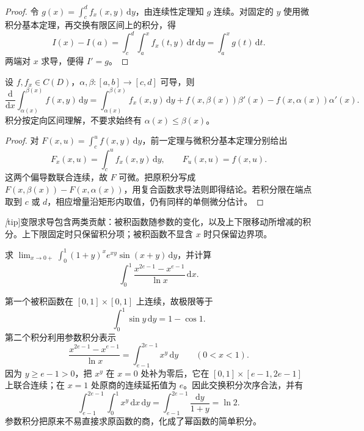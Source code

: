 \documentclass[UTF8,12pt,a4paper,fontset=fandol]{ctexbook}
\begin{document}
\begin{proof}
令 $g(x)=\int_c^d f_x(x,y)\,\mathrm{d}y$，由连续性定理知 $g$ 连续。对固定的 $y$ 使用微积分基本定理，再交换有限区间上的积分，得
\[
    I(x)-I(a)=\int_c^d\int_a^x f_x(t,y)\,\mathrm{d}t\,\mathrm{d}y
    =\int_a^x g(t)\,\mathrm{d}t.
\]
两端对 $x$ 求导，便得 $I'=g$。
\end{proof}

\begin{theorem}[变限积分的莱布尼茨公式]
\label{thm:parameter-leibniz-variable-limits}
设 $f,f_x\in C(D)$，$\alpha,\beta:[a,b]\to[c,d]$ 可导，则
\begin{equation}
    \frac{\mathrm{d}}{\mathrm{d}x}
      \int_{\alpha(x)}^{\beta(x)}f(x,y)\,\mathrm{d}y
    =\int_{\alpha(x)}^{\beta(x)}f_x(x,y)\,\mathrm{d}y
      +f(x,\beta(x))\beta'(x)-f(x,\alpha(x))\alpha'(x).
    \label{eq:parameter-leibniz-variable-limits}
\end{equation}
积分按定向区间理解，不要求始终有 $\alpha(x)\leq\beta(x)$。
\end{theorem}

\begin{proof}
对 $F(x,u)=\int_c^u f(x,y)\,\mathrm{d}y$，前一定理与微积分基本定理分别给出
\[
    F_x(x,u)=\int_c^u f_x(x,y)\,\mathrm{d}y,
    \qquad F_u(x,u)=f(x,u).
\]
这两个偏导数联合连续，故 $F$ 可微。把原积分写成 $F(x,\beta(x))-F(x,\alpha(x))$，用复合函数求导法则即得结论。若积分限在端点取到 $c$ 或 $d$，相应增量沿矩形内取值，仍有同样的单侧微分估计。
\end{proof}

\emph[tip]{变限求导包含两类贡献：被积函数随参数的变化，以及上下限移动所增减的积分。}上下限固定时只保留积分项；被积函数不显含 $x$ 时只保留边界项。

\begin{example}
\label{ex:parameter-finite-limit-and-logarithm}
求 $\displaystyle\lim_{x\to0+}\int_0^1(1+y)^x e^{xy}\sin(x+y)\,\mathrm{d}y$，并计算
\[
    \int_0^1\frac{x^{2e-1}-x^{e-1}}{\ln x}\,\mathrm{d}x.
\]
\end{example}

\begin{solve}
第一个被积函数在 $[0,1]\times[0,1]$ 上连续，故极限等于
\[
    \int_0^1\sin y\,\mathrm{d}y=1-\cos1.
\]
第二个积分利用参数积分表示
\[
    \frac{x^{2e-1}-x^{e-1}}{\ln x}
    =\int_{e-1}^{2e-1}x^y\,\mathrm{d}y\qquad(0<x<1).
\]
因为 $y\geq e-1>0$，把 $x^y$ 在 $x=0$ 处补为零后，它在 $[0,1]\times[e-1,2e-1]$ 上联合连续；在 $x=1$ 处原商的连续延拓值为 $e$。因此交换积分次序合法，并有
\[
    \int_{e-1}^{2e-1}\int_0^1 x^y\,\mathrm{d}x\,\mathrm{d}y
    =\int_{e-1}^{2e-1}\frac{\mathrm{d}y}{1+y}
    =\ln2.
\]
参数积分把原来不易直接求原函数的商，化成了幂函数的简单积分。
\end{solve}
\end{document}
